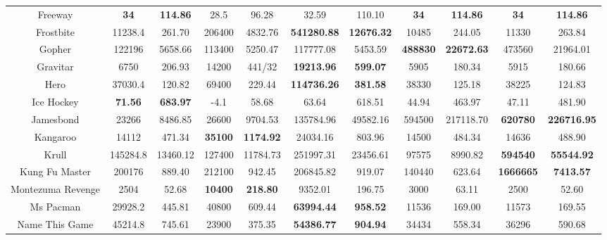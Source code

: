 \documentclass[nohyperref]{article}
\newcommand{\best}[1]{\textbf{#1}}
\theoremstyle{plain}
\begin{document}
\begin{table}[!hb]
\begin{center}
\begin{tabular}{| c| c c| c c| c c| c c| c c|}
 Freeway       & \textbf{34}       & \textbf{114.86}   & 28.5   & 96.28    & 32.59& 110.10          &\best{34}         &\best{114.86}         &\textbf{34}               &\textbf{114.86}\\
 Frostbite    & 11238.4  & 261.70   & 206400 & 4832.76&\textbf{541280.88}&\textbf{12676.32}         &10485             &244.05                &11330	           &263.84\\
 Gopher  & 122196        & 5658.66  & 113400 & 5250.47  & 117777.08 & 5453.59                       &\best{488830}     &\best{22672.63}       &473560           &21964.01\\
 Gravitar & 6750         & 206.93   & 14200  & 441/32  &\textbf{19213.96}&\textbf{599.07}           &5905              &180.34                &5915             &180.66\\
 Hero   & 37030.4        & 120.82   & 69400  & 229.44&\textbf{114736.26}&\textbf{381.58}            &38330             &125.18                &38225	            &124.83\\
 Ice Hockey & \textbf{71.56}      & \textbf{683.97}   &-4.1   & 58.68    & 63.64& 618.51            &44.94             &463.97                &47.11           &481.90\\
 Jamesbond  & 23266      & 8486.85  & 26600  & 9704.53  & 135784.96 & 49582.16                      &594500            &217118.70             &\textbf{620780	}          &\textbf{226716.95}\\
 Kangaroo   & 14112      & 471.34   & \textbf{35100}  & \textbf{1174.92}&24034.16& 803.96           &14500             &484.34                &14636           &488.90\\
 Krull     & 145284.8    & 13460.12 & 127400&11784.73& 251997.31&23456.61         &97575             &8990.82                                 &\textbf{594540}          &\textbf{55544.92}\\
 Kung Fu Master & 200176 & 889.40   & 212100 & 942.45   & 206845.82 & 919.07      &140440            &623.64                &\textbf{1666665}	         &\textbf{7413.57}\\
 Montezuma Revenge & 2504 & 52.68   & \textbf{10400}  & \textbf{218.80} &9352.01& 196.75            &3000              &63.11                 &2500            &52.60\\
 Ms Pacman  & 29928.2     & 445.81  & 40800  & 609.44& \textbf{63994.44}&\textbf{958.52}            &11536             &169.00                &11573           &169.55\\
 Name This Game & 45214.8 & 745.61  & 23900  & 375.35&\textbf{54386.77}&\textbf{904.94}             &34434             &558.34                &36296           &590.68\\

\end{tabular}
\end{center}
\end{table}
\end{document}
